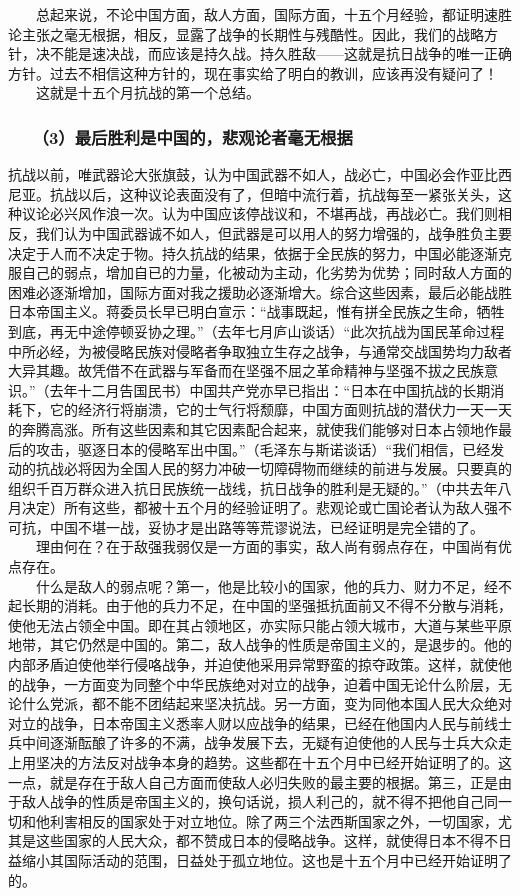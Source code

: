 \documentclass[cn,11pt,chinese]{elegantbook}
\def\myformat#1{\hfil\hfil #1}
\begin{document}
　　总起来说，不论中国方面，敌人方面，国际方面，十五个月经验，都证明速胜论主张之毫无根据，相反，显露了战争的长期性与残酷性。因此，我们的战略方针，决不能是速决战，而应该是持久战。持久胜敌——这就是抗日战争的唯一正确方针。过去不相信这种方针的，现在事实给了明白的教训，应该再没有疑问了！\\
　　这就是十五个月抗战的第一个总结。\\
\subsubsection*{\myformat{　　（3）最后胜利是中国的，悲观论者毫无根据}}
抗战以前，唯武器论大张旗鼓，认为中国武器不如人，战必亡，中国必会作亚比西尼亚。抗战以后，这种议论表面没有了，但暗中流行着，抗战每至一紧张关头，这种议论必兴风作浪一次。认为中国应该停战议和，不堪再战，再战必亡。我们则相反，我们认为中国武器诚不如人，但武器是可以用人的努力增强的，战争胜负主要决定于人而不决定于物。持久抗战的结果，依据于全民族的努力，中国必能逐渐克服自己的弱点，增加自已的力量，化被动为主动，化劣势为优势；同时敌人方面的困难必逐渐增加，国际方面对我之援助必逐渐增大。综合这些因素，最后必能战胜日本帝国主义。蒋委员长早已明白宣示：“战事既起，惟有拼全民族之生命，牺牲到底，再无中途停顿妥协之理。”（去年七月庐山谈话）“此次抗战为国民革命过程中所必经，为被侵略民族对侵略者争取独立生存之战争，与通常交战国势均力敌者大异其趣。故凭借不在武器与军备而在坚强不屈之革命精神与坚强不拔之民族意识。”（去年十二月告国民书）中国共产党亦早已指出：“日本在中国抗战的长期消耗下，它的经济行将崩溃，它的士气行将颓靡，中国方面则抗战的潜伏力一天一天的奔腾高涨。所有这些因素和其它因素配合起来，就使我们能够对日本占领地作最后的攻击，驱逐日本的侵略军出中国。”（毛泽东与斯诺谈话）“我们相信，已经发动的抗战必将因为全国人民的努力冲破一切障碍物而继续的前进与发展。只要真的组织千百万群众进入抗日民族统一战线，抗日战争的胜利是无疑的。”（中共去年八月决定）所有这些，都被十五个月的经验证明了。悲观论或亡国论者认为敌人强不可抗，中国不堪一战，妥协才是出路等等荒谬说法，已经证明是完全错的了。\\
　　理由何在？在于敌强我弱仅是一方面的事实，敌人尚有弱点存在，中国尚有优点存在。\\
　　什么是敌人的弱点呢？第一，他是比较小的国家，他的兵力、财力不足，经不起长期的消耗。由于他的兵力不足，在中国的坚强抵抗面前又不得不分散与消耗，使他无法占领全中国。即在其占领地区，亦实际只能占领大城市，大道与某些平原地带，其它仍然是中国的。第二，敌人战争的性质是帝国主义的，是退步的。他的内部矛盾迫使他举行侵咯战争，并迫使他采用异常野蛮的掠夺政策。这样，就使他的战争，一方面变为同整个中华民族绝对对立的战争，迫着中国无论什么阶层，无论什么党派，都不能不团结起来坚决抗战。另一方面，变为同他本国人民大众绝对对立的战争，日本帝国主义悉率人财以应战争的结果，已经在他国内人民与前线士兵中间逐渐酝酿了许多的不满，战争发展下去，无疑有迫使他的人民与士兵大众走上用坚决的方法反对战争本身的趋势。这些都在十五个月中已经开始证明了的。这一点，就是存在于敌人自己方面而使敌人必归失败的最主要的根据。第三，正是由于敌人战争的性质是帝国主义的，换句话说，损人利己的，就不得不把他自己同一切和他利害相反的国家处于对立地位。除了两三个法西斯国家之外，一切国家，尤其是这些国家的人民大众，都不赞成日本的侵略战争。这样，就使得日本不得不日益缩小其国际活动的范围，日益处于孤立地位。这也是十五个月中已经开始证明了的。\\
\end{document}
